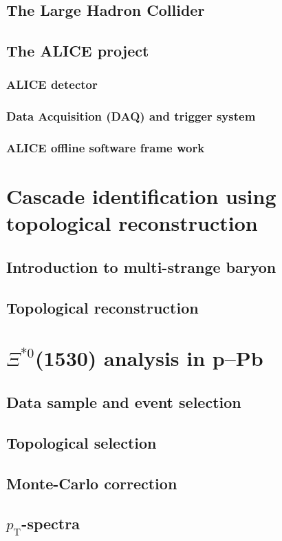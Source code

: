 \documentclass[11pt, oneside]{article}   	%
\newcommand{\xis}{\Xi^{*0}}
\newcommand{\pt}{\ensuremath{p_{\mathrm{T}}}}
\begin{document}
\subsection{The Large Hadron Collider}
\subsection{The ALICE project}
\subsubsection{ALICE detector}
\subsubsection{Data Acquisition (DAQ) and trigger system}
\subsubsection{ALICE offline software frame work}

\newpage

\section{Cascade identification using topological reconstruction}
\subsection{Introduction to multi-strange baryon}
\subsection{Topological reconstruction}

\section{$\xis$(1530) analysis in p--Pb}
\subsection{Data sample and event selection}
\subsection{Topological selection}
\subsection{Monte-Carlo correction}
\subsection{$\pt$-spectra}
\end{document}
